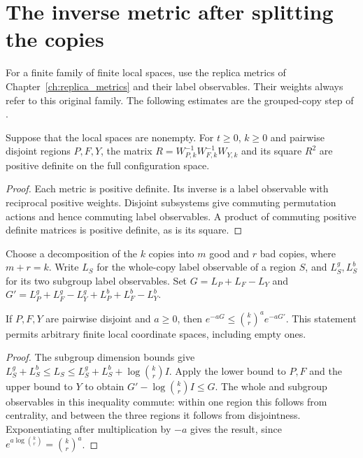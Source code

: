 \section{The inverse metric after splitting the copies}

For a finite family of finite local spaces, use the replica metrics of
Chapter~\ref{ch:replica_metrics} and their label observables. Their weights
always refer to this original family. The following estimates are the grouped-copy
step of \cite[Section~8]{OpenAI2026AreaLaw}.

\begin{theorem}
  \label{thm:disjoint_replica_metric_positive}
  \leanok
  Suppose that the local spaces are nonempty. For $t\geq0$, $k\geq0$
  and pairwise disjoint regions $P,F,Y$, the
  matrix $R=W_{P,k}^{-1}W_{F,k}^{-1}W_{Y,k}$ and its square $R^2$ are
  positive definite on the full configuration space.
\end{theorem}
\begin{proof}\leanok
  Each metric is positive definite. Its inverse is a label observable
  with reciprocal positive weights. Disjoint subsystems give commuting
  permutation actions and hence commuting label observables.
  A product of commuting positive definite matrices is positive
  definite, as is its square.
\end{proof}

Choose a decomposition of the $k$ copies into $m$ good and $r$ bad copies,
where $m+r=k$. Write $L_S$ for the whole-copy label observable of a region
$S$, and $L^g_S,L^b_S$ for its two subgroup label observables. Set
$G=L_P+L_F-L_Y$ and
$G'=L^g_P+L^g_F-L^g_Y+L^b_P+L^b_F-L^b_Y$.

\begin{theorem}
  \label{thm:grouped_label_exponential}
  \leanok
  If $P,F,Y$ are pairwise disjoint and $a\geq0$, then
  $e^{-aG}\leq\binom{k}{r}^{a}e^{-aG'}$.
  This statement permits arbitrary finite local coordinate spaces,
  including empty ones.
\end{theorem}
\begin{proof}\leanok
  The subgroup dimension bounds give
  $L^g_S+L^b_S\leq L_S\leq L^g_S+L^b_S+\log\binom{k}{r}I$.
  Apply the lower bound to $P,F$ and the upper bound to $Y$ to obtain
  $G'-\log\binom{k}{r}I\leq G$. The whole and subgroup observables
  in this inequality commute: within one region this follows from
  centrality, and between the three regions it follows from disjointness.
  Exponentiating after multiplication by $-a$ gives the result, since
  $e^{a\log\binom{k}{r}}=\binom{k}{r}^a$.
\end{proof}


